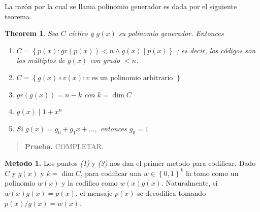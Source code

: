 \documentclass[a4paper]{article}
\newtheorem{theorem}{Theorem}
\newtheorem{theorem}{Theorem}
\begin{document}
La razón por la cual se llama polinomio generador es dada por el siguiente teorema.

\begin{theorem}
    Sea $C$ cíclico y $g(x)$ su polinomio generador. Entonces 

    \begin{enumerate}
        \item $C = \left\{ p(x) : gr\left( p(x) \right) < n \land  g(x) \mid p(x)  \right\} $ ; es decir, 
            los códigos son los múltiplos de $g(x)$ con grado $<n$. 
        \item $C = \left\{ g(x) \circ v(x) : v \text{ es un polinomio arbitrario } \right\} $
        \item $gr\left( g(x) \right) = n - k$ con $k = \dim C$ 
        \item $g(x) \mid 1 + x^n$ 
        \item Si $g(x) = g_0 + g_1x + \ldots, $ entonces $g_0 = 1$
    \end{enumerate}
\end{theorem}


\small
\begin{quote}

\textbf{Prueba.} COMPLETAR.

\end{quote}
\normalsize

\textbf{Metodo 1.} Los puntos \textit{(1)} y \textit{(3)} nos dan el primer
metodo para codificar. Dado $C$ y $g(x)$ y $k = \dim C$, para codificar 
una $w \in \left\{ 0, 1 \right\}^k $ la tomo como un polinomio $w(x)$
y la codifico como $w(x) g(x)$. Naturalmente, si $w(x)g(x) = p(x)$,
el mensaje $p(x)$ se decodifica tomando $p(x) / g(x) = w(x)$.
\end{document}
